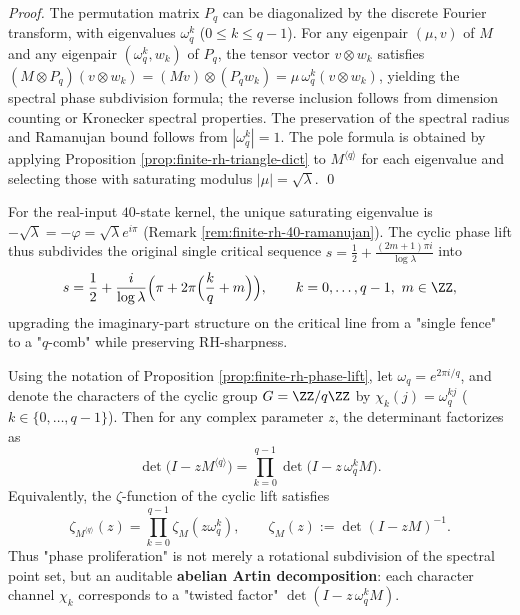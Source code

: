 \begin{proof}
The permutation matrix $P_q$ can be diagonalized by the discrete Fourier transform, with eigenvalues $\omega_q^k$ ($0\le k\le q-1$).
For any eigenpair $(\mu,v)$ of $M$ and any eigenpair $(\omega_q^k,w_k)$ of $P_q$, the tensor vector $v\otimes w_k$ satisfies
\(
(M\otimes P_q)(v\otimes w_k)=(Mv)\otimes(P_qw_k)=\mu\,\omega_q^k (v\otimes w_k)
\), yielding the spectral phase subdivision formula; the reverse inclusion follows from dimension counting or Kronecker spectral properties.
The preservation of the spectral radius and Ramanujan bound follows from $|\omega_q^k|=1$.
The pole formula is obtained by applying Proposition \ref{prop:finite-rh-triangle-dict} to $M^{\langle q\rangle}$ for each eigenvalue and selecting those with saturating modulus $|\mu|=\sqrt{\lambda}$. \qed
\end{proof}

\begin{remark}\label{rem:finite-rh-40-phase-lift}
For the real-input $40$-state kernel, the unique saturating eigenvalue is $-\sqrt{\lambda}=-\varphi=\sqrt{\lambda}e^{i\pi}$ (Remark \ref{rem:finite-rh-40-ramanujan}).
The cyclic phase lift thus subdivides the original single critical sequence
\(
s=\tfrac12+\frac{(2m+1)\pi i}{\log\lambda}
\)
into
\[
s=\frac12+\frac{i}{\log\lambda}\Bigl(\pi+2\pi\Bigl(\frac{k}{q}+m\Bigr)\Bigr),
\qquad k=0,\dots,q-1,\ m\in\ZZ,
\]
upgrading the imaginary-part structure on the critical line from a "single fence" to a "$q$-comb" while preserving RH-sharpness.
\end{remark}

\begin{proposition}\label{prop:finite-rh-phase-lift-artin}
Using the notation of Proposition \ref{prop:finite-rh-phase-lift}, let
\(
\omega_q=e^{2\pi i/q}
\), and denote the characters of the cyclic group \(G=\ZZ/q\ZZ\) by \(\chi_k(j)=\omega_q^{kj}\) (\(k\in\{0,\dots,q-1\}\)).
Then for any complex parameter \(z\), the determinant factorizes as
\[
\det\!\bigl(I-zM^{\langle q\rangle}\bigr)
=\prod_{k=0}^{q-1}\det\!\bigl(I-z\,\omega_q^k M\bigr).
\]
Equivalently, the \(\zeta\)-function of the cyclic lift satisfies
\[
\zeta_{M^{\langle q\rangle}}(z)
=\prod_{k=0}^{q-1}\zeta_{M}(z\omega_q^k),
\qquad
\zeta_M(z):=\det(I-zM)^{-1}.
\]
Thus "phase proliferation" is not merely a rotational subdivision of the spectral point set, but an auditable \textbf{abelian Artin decomposition}: each character channel \(\chi_k\) corresponds to a "twisted factor" \(\det(I-z\,\omega_q^k M)\).
\end{proposition}

